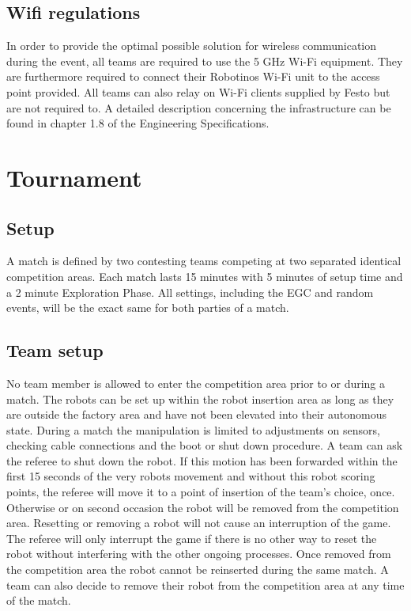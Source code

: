 \documentclass[12pt,twoside]{article}
\begin{document}
\subsection{Wifi regulations}
\label{sec:wifi-regulations}
In order to provide the optimal possible solution for wireless
communication during the event, all teams are required to use the 5
GHz Wi-Fi equipment. They are furthermore required to connect their
Robotinos Wi-Fi unit to the access point provided. All teams can also
relay on Wi-Fi clients supplied by Festo but are not required to. A
detailed description concerning the infrastructure can be found in
chapter 1.8 of the Engineering Specifications.



\section{Tournament}
\subsection{Setup}

A match is defined by two contesting teams competing at two separated
identical competition areas. Each match lasts 15 minutes with 5
minutes of setup time and a 2 minute Exploration Phase. All settings, including
the EGC and random events, will be the exact same for both parties of a match.

\subsection{Team setup}
\label{sec:team-setup}
No team member is allowed to enter the competition area prior to or
during a match. The robots can be set up within the robot insertion
area as long as they are outside the factory area and have not been
elevated into their autonomous state. During a match the manipulation
is limited to adjustments on sensors, checking cable connections and
the boot or shut down procedure. A team can ask the referee to shut
down the robot. If this motion has been forwarded within the first 15
seconds of the very robots movement and without this robot scoring
points, the referee will move it to a point of insertion of the team's
choice, once. Otherwise or on second occasion the robot will be
removed from the competition area. Resetting or removing a robot will
not cause an interruption of the game. The referee will only interrupt
the game if there is no other way to reset the robot without
interfering with the other ongoing processes. Once removed from the
competition area the robot cannot be reinserted during the same match.
A team can also decide to remove their robot from the competition area
at any time of the match.
\end{document}
